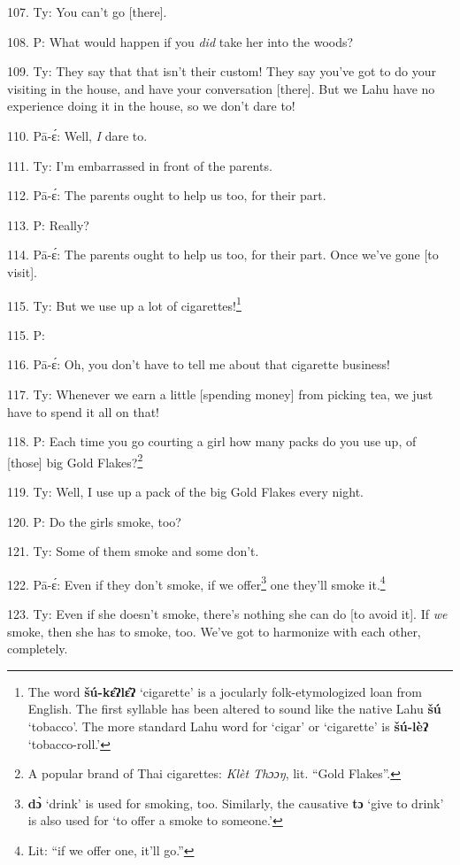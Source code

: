 107. Ty: You can't go [there].

108. P: What would happen if you \textit{did} take her into the woods?

109. Ty: They say that that isn't their custom! They say you've got to do
your visiting in the house, and have your conversation [there]. But we Lahu have
no experience doing it in the house, so we don't dare to!

110. Pā-ɛ́: Well,\textit{ I} dare to.

111. Ty: I'm embarrassed in front of the parents.

112. Pā-ɛ́: The parents ought to help us too, for their part.

113. P: Really?

114. Pā-ɛ́: The parents ought to help us too, for their part. Once we've gone
[to visit].

115. Ty: But we use up a lot of cigarettes!\footnote{The word \textbf{šú-kɛ̂ʔlɛ̂ʔ} `cigarette' is a jocularly folk-etymologized loan from English. The first syllable has been altered to sound like the native Lahu \textbf{šú} `tobacco'. The more standard Lahu word for `cigar' or `cigarette' is \textbf{šú-lèʔ} `tobacco-roll.'}

115. P: 

116. Pā-ɛ́: Oh, you don't have to tell me about that cigarette business!

117. Ty: Whenever we earn a little [spending money] from picking tea, we just
have to spend it all on that!

118. P:  Each time you go courting a girl how
many packs do you use up, of [those] big Gold Flakes?\footnote{A popular brand of Thai cigarettes: \textit{Klèt Thɔɔŋ}, lit. ``Gold Flakes''.}

119. Ty: Well, I use up a pack of the big Gold Flakes every night.

120. P: Do the girls smoke, too?

121. Ty: Some of them smoke and some don't.

122. Pā-ɛ́: Even if they don't smoke, if we offer\footnote{\textbf{dɔ̀} `drink' is used for smoking, too. Similarly, the causative \textbf{tɔ} `give to drink' is also used for `to offer a smoke to someone.'} one they'll smoke it.\footnote{Lit: ``if we offer one, it'll go.''}

123. Ty: Even if she doesn't smoke, there's nothing she can do [to avoid it].
If \textit{we} smoke, then she has to smoke, too. We've got to harmonize with each
other, completely.

